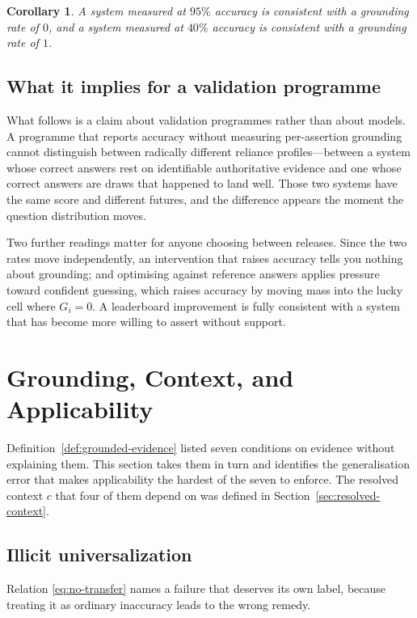 \documentclass[11pt]{article}
\theoremstyle{plain}
\newtheorem{corollary}{Corollary}
\theoremstyle{definition}
\begin{document}
\begin{corollary}
\label{cor:no-bound}
A system measured at $95\%$ accuracy is consistent with a grounding rate of $0$,
and a system measured at $40\%$ accuracy is consistent with a grounding rate of
$1$.
\end{corollary}

\subsection{What it implies for a validation programme}

What follows is a claim about validation programmes rather than about models. A
programme that reports accuracy without measuring per-assertion grounding cannot
distinguish between radically different reliance profiles---between a system whose
correct answers rest on identifiable authoritative evidence and one whose correct
answers are draws that happened to land well. Those two systems have the same
score and different futures, and the difference appears the moment the question
distribution moves.

Two further readings matter for anyone choosing between releases. Since the two
rates move independently, an intervention that raises accuracy tells you nothing
about grounding; and optimising against reference answers applies pressure toward
confident guessing, which raises accuracy by moving mass into the lucky cell where
$G_i = 0$. A leaderboard improvement is fully consistent with a system that has
become more willing to assert without support.


\section{Grounding, Context, and Applicability}
\label{sec:grounding-context}

Definition~\ref{def:grounded-evidence} listed seven conditions on evidence without
explaining them. This section takes them in turn and identifies the generalisation error
that makes applicability the hardest of the seven to enforce. The resolved context $c$
that four of them depend on was defined in Section~\ref{sec:resolved-context}.

\subsection{Illicit universalization}
\label{sec:illicit}

Relation \eqref{eq:no-transfer} names a failure that deserves its own label,
because treating it as ordinary inaccuracy leads to the wrong remedy.
\end{document}

